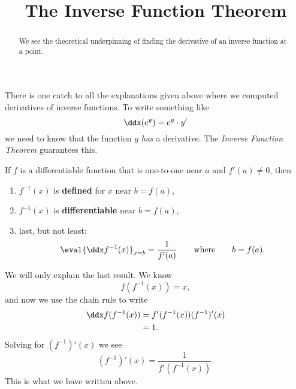 \documentclass{ximera}
\title[Dig-In:]{The Inverse Function Theorem}
\begin{document}
\begin{abstract}
  We see the theoretical underpinning of finding the derivative of an
  inverse function at a point.
\end{abstract}
\maketitle

There is one catch to all the explanations given above where we
computed derivatives of inverse functions. To write something like
\[
\ddx(e^y)=e^y\cdot y'
\]
we need to know that the function $y$ \textit{has} a derivative.  The
\textit{Inverse Function Theorem} guarantees this.

\begin{theorem}\label{theorem:IFT}
	If $f$ is a differentiable function that is one-to-one near $a$ and $f'(a) \neq 0$, then
	\begin{enumerate}
		\item $f^{-1}(x)$ is \textbf{defined} for $x$ near $b=f(a)$,
		\item $f^{-1}(x)$ is \textbf{differentiable} near $b=f(a)$, 
		\item last, but not least:
		  \[ \eval{\ddx f^{-1}(x)}_{x=b}  = \frac{1}{f'(a)}\qquad\text{where}\qquad b = f(a). \]
	\end{enumerate}
	\begin{explanation}
		  We will only explain the last result. We know
		  \[ f(f^{-1}(x)) = x, \]
		  and now we use the chain rule to write
		  \begin{align*}
			  \ddx f(f^{-1}(x)) &= f'(f^{-1}(x)) (f^{-1})'(x)\\
				  &=1.
		  \end{align*}
		  Solving for $(f^{-1})'(x)$ we see
		  \[  (f^{-1})'(x) = \frac{1}{f'(f^{-1}(x))}. \]
		  This is what we have written above.
	\end{explanation}
\end{theorem}
\end{document}
